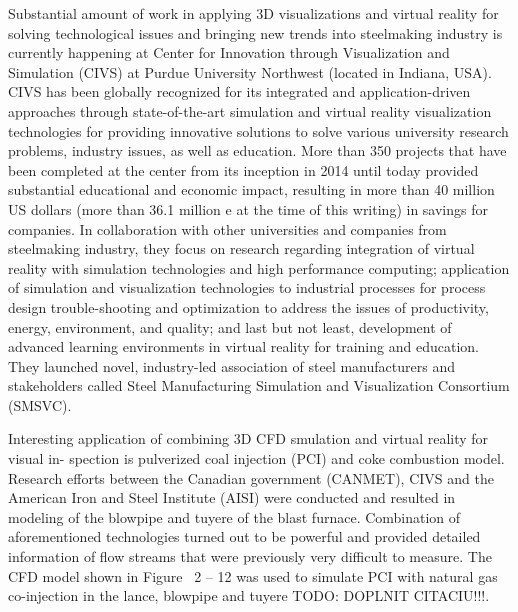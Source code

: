Substantial amount of work in applying 3D visualizations and virtual reality for solving technological issues and bringing new trends into steelmaking industry is currently happening at Center for Innovation through Visualization and Simulation (CIVS) at Purdue University Northwest (located in Indiana, USA). CIVS has been globally recognized for its integrated and application-driven approaches through state-of-the-art simulation and virtual reality visualization technologies for providing innovative solutions to solve various university research problems, industry issues, as well as education. More than 350 projects that have been completed at the center from its inception in 2014 until today provided substantial educational and economic impact, resulting in more than 40 million US dollars (more than 36.1 million e at the time of this writing) in savings for companies. In collaboration with other universities and companies from steelmaking industry, they focus on research regarding integration of virtual reality with simulation technologies and high performance computing; application of simulation and visualization technologies to industrial processes for process design trouble-shooting and optimization to address the issues of productivity, energy, environment, and quality; and last but not least, development of advanced learning environments in virtual reality for training and education. They launched novel, industry-led association of steel manufacturers and stakeholders called Steel Manufacturing Simulation and Visualization Consortium (SMSVC).

Interesting application of combining 3D CFD smulation and virtual reality for visual in- spection is pulverized coal injection (PCI) and coke combustion model. Research efforts between the Canadian government (CANMET), CIVS and the American Iron and Steel Institute (AISI) were conducted and resulted in modeling of the blowpipe and tuyere of the blast furnace. Combination of aforementioned technologies turned out to be powerful and provided detailed information of flow streams that were previously very difficult to measure. The CFD model shown in Figure~ 2 – 12 was used to simulate PCI with natural gas co-injection in the lance, blowpipe and tuyere TODO: DOPLNIT CITACIU!!!.

